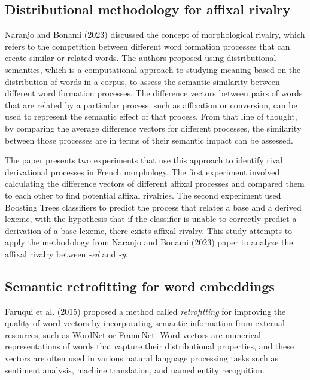 \documentclass[12pt]{article}
\begin{document}
\subsection{Distributional methodology for affixal rivalry}
Naranjo and Bonami (2023) discussed the concept of morphological rivalry, which refers to the competition between different word formation processes that can create similar or related words. The authors proposed using distributional semantics, which is a computational approach to studying meaning based on the distribution of words in a corpus, to assess the semantic similarity between different word formation processes. The difference vectors between pairs of words that are related by a particular process, such as affixation or conversion, can be used to represent the semantic effect of that process. From that line of thought, by comparing the average difference vectors for different processes, the similarity between those processes are in terms of their semantic impact can be assessed.

The paper presents two experiments that use this approach to identify rival derivational processes in French morphology. The first experiment involved calculating the difference vectors of different affixal processes and compared them to each other to find potential affixal rivalries. The second experiment used Boosting Trees classifiers to predict the process that relates a base and a derived lexeme, with the hypothesis that if the classifier is unable to correctly predict a derivation of a base lexeme, there exists affixal rivalry. This study attempts to apply the methodology from Naranjo and Bonami (2023) paper to analyze the affixal rivalry between \emph{-ed} and \emph{-y}. 

\subsection{Semantic retrofitting for word embeddings}
Faruqui et al. (2015) proposed a method called \emph{retrofitting} for improving the quality of word vectors by incorporating semantic information from external resources, such as WordNet or FrameNet. Word vectors are numerical representations of words that capture their distributional properties, and these vectors are often used in various natural language processing tasks such as sentiment analysis, machine translation, and named entity recognition.
\end{document}

